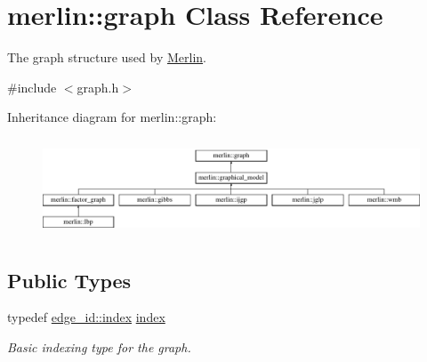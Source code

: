 \hypertarget{classmerlin_1_1graph}{}\section{merlin\+:\+:graph Class Reference}
\label{classmerlin_1_1graph}


The graph structure used by \hyperlink{classMerlin}{Merlin}.  




{\ttfamily \#include $<$graph.\+h$>$}

Inheritance diagram for merlin\+:\+:graph\+:\begin{figure}[H]
\begin{center}
\leavevmode
\includegraphics[height=2.928105cm]{classmerlin_1_1graph}
\end{center}
\end{figure}
\subsection*{Public Types}
\begin{DoxyCompactItemize}
\item 
\hypertarget{classmerlin_1_1graph_a5cade38832f47248573e921276f122d6}{}typedef \hyperlink{structmerlin_1_1edge__id_af57e3c1f2c2c3194d96468a5f0e7cce0}{edge\+\_\+id\+::index} \hyperlink{classmerlin_1_1graph_a5cade38832f47248573e921276f122d6}{index}\label{classmerlin_1_1graph_a5cade38832f47248573e921276f122d6}

\begin{DoxyCompactList}\small\item\em Basic indexing type for the graph. \end{DoxyCompactList}\end{DoxyCompactItemize}
